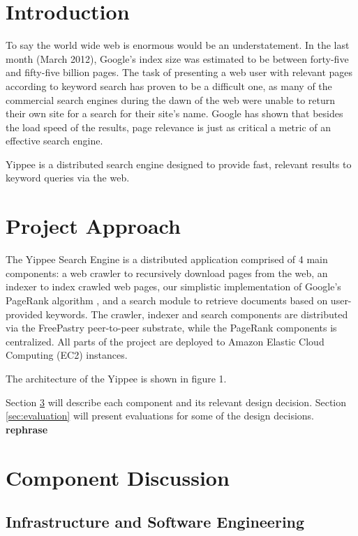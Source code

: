 \documentclass[11pt, letterpaper, oneside, twocolumn]{article}
\begin{document}
\section{ Introduction }

To say the world wide web is enormous would be an understatement.  
In the last month (March 2012),  Google's index size was estimated to be between forty-five and fifty-five billion pages.\cite{websize}
The task of presenting a web user with relevant pages according to keyword search has proven to be a difficult one, as many of the commercial search engines during the dawn of the web were unable to return their own site for a search for their site's name.\cite{google} 
Google has shown that besides the load speed of the results, page relevance is just as critical a metric of an effective search engine. 

Yippee is a distributed search engine designed to provide fast, relevant results to keyword queries via the web.  

\section{Project Approach}
\label{sec:approach}

The Yippee Search Engine is a distributed application comprised of 4 main components: a web crawler to recursively download pages from the web, an indexer to index crawled web pages, our simplistic implementation of Google's PageRank algorithm \cite{pagerank}, and a search module to retrieve documents based on user-provided keywords.  
The crawler, indexer and search components are distributed via the FreePastry peer-to-peer substrate, while the PageRank components is centralized.  All parts of the project are deployed to Amazon Elastic Cloud Computing (EC2) instances.  

The architecture of the Yippee is shown in figure 1.



Section \ref{sec:component} will describe each component and its relevant design decision.
Section \ref{sec:evaluation} will present evaluations for some of the design decisions. \textbf{rephrase}

\section{Component Discussion}
\label{sec:component}

\subsection{Infrastructure and Software Engineering}
\end{document}
